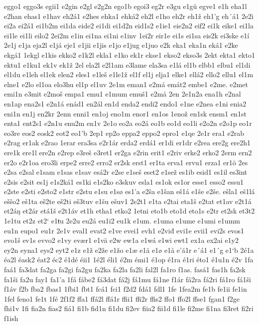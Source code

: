 eggo1
eggo3s
egii1
e2gin
e2gl
e2g2n
ego1b
egoi3
eg2r
e3gu
e1gü
egve1
e1h
eha1l
e2han
ehas1
e1hav
eh2á1
e2hes
ehka1
ehká2
eh2l
e1ho
eh2r
eh1ž
eh1'g
eh´á1
2e2i
ei2a
ei2á1
ei1b2m
ei1da
eide2
ei1di
ei1d2n
eid1s2
e1ie1
eie2n2
eif2
ei1k
eike1
ei1la
ei1le
ei1li
eilo2
2ei2m
e1in
ei1na
ei1ni
e1inv
1ei2r
eir1e
ei1s
ei1sa
eis2k
ei3ske
e1í
2e1j
e1ja
eja2l
e1já
eje1
e1jii
e1jis
e1jo
e1jug
e1juo
e2k
eka1
eka1n
eká1
e2ke
ekgá1
1ekgl
e1kis
ekko2
e1k2l
ekla1
e1ko
ek1r
ekse1
ekso2
ekso3s
2ekt
ekta1
ekto1
ektu1
e1ku1
ek1v
ek1ž
2el
ela2l
e2l1am
e3lame
ela3sa
e1lá
el1b
elbb1
elbu1
el1di
el1du
e1leh
el1ek
elen2
eles1
e1leš
e1le1ž
el1f
el1j
elja1
elke1
ellá2
ello2
ellu1
el1m
elne1
e2lo
el1oa
elo3hu
el1p
el1uv
2e1m
eman1
e2má
emát2
embe1
e2me.
e2met
emi1n
e3mit
e2moš
empa1
emu1
e1mum
emuš1
e2må
2en
2e1n2a
ena1h
e2nal
en1ap
ena2s1
e2n1á
enád1
en2ál
en1d
enda2
endi2
endo1
e1ne
e2nea
e1ni
enia2
eni1n
en1j
en2kr
2enn
enni1
en1oj
eno1m
enor1
en1os
1enož
en1sk
ensm1
en1st
enta1
ent2s1
e2n1u
enu2m
en1v
2e1o
eo2a
eo2á
eo1b
eo1d
eo1li
e2o2n
e2o1p
eo1r
eo3re
eos2
eosk2
eot2
eo1'b
2ep1
ep2o
eppa2
eppo2
epro1
e1qe
2e1r
era1
e2rab
e2rag
er1ak
e2rao
1erar
era3sa
e2r1ár
erda2
erdá1
er1di
er1dr
e2rea
ere2g
ere2h1
ere1k
ere1l
ere2n
e2rep
e3reš
e3ret1
er2ga
e2rin
erit1
e2riv
erke2
erko2
2erm
ern2
er2o
e2r1oa
ero3li
erpe2
erre2
erro2
er2sk
erst1
er1ta
erva1
ervu1
erza1
er1ö
2es
e2sa
e2sal
e1sam
e1sas
e1sav
esá2r
e2se
e1seš
eset2
e1sež
es1ib
esid1
es1il
es3int
e2sis
e2sit
es1j
e1s2ká1
es1ki
e1s2ko
e3skuv
esla1
es1ok
es1or
esse1
esso2
essu1
e2ste
e2sti
e2sto2
e1str
e2stu
e1su
e1sø
es1'a
e2ša
e1šan
eš1á
e1še
e2še.
ešla1
eš1lá
eššo2
eš1ta
eš2te
eš2ti
eš3tuv
e1šu
ešuv1
2e2t1
e1ta
e2tai
eta1š
e2tat
et1av
e2t1á
et2áŋ
et2ár
etá1š
e2t1áv
et1h
etha1
etko2
1etni
eto1b
eto1d
eto1s
e2tr
et2sk
et3t2
1e1tu
et2z
et2`
e1ŧu
2e2u
eu2á
eu1i2
eu1k
e1um.
e1uma
e1ume
e1umi
e1umm
eu1n
eupo1
eu1r
2e1v
eval1
evat2
e1ve
evei1
evh1
e2viđ
evi1e
evii1
evi2s
evos1
evo1š
ev1s
evvo2
e1vy
evær1
e1vä
e2w
ew1a
e1wá
e1wi
ewt1
ex1a
ex2ai
e1y2
ey2n
eyna1
eys2
eyt2
e1z
e1ž
e2že
e1žo
e1æ
e1ä
e1ø
e1å
e'á1r
e´á1
e1´g
e1`b
2é1a
éa2l
éask2
éat2
éc2
é1dé
éii1
1é2l
éli1
é2m
émi1
é1op
é1ra
é1ri
éto1
é1u1n
é2v
1fa
faá1
fa3dat
fa2ga
fa2gi
fa2gu
fa2ka
fa2la
fa2li
fal2l
fa1ro
f1as.
fasá1
fas1h
fa2sk
fa1ši
fa2u
fay1
fa1'a
1fá
fábe2
fá3dat
fá2j
fá1mu
fá1ne
f1ár
fá2ra
fá2ri
fá1ro
fá1ši
f1áv
f2b
fba2
fbas1
1fbi1
fbt1
fcá1
fci1
f2d2
fdá1
fdl1
1fe
1fea2m
fe1b
fe1ii
fe1in
1fel
feno1
fe1t
1fé
2f1f2
ffa1
ffá2l
ffá1r
ffii1
ffi2r
ffis2
ffo1
ffo2l
ffse1
fgan1
f2ge
fhi1v
1fi
fia2n
fias2
fiá1
fi1b
fid1n
fi1du
fi2ev
fiia2
fii1d
fi1le
fi2me
fi1na
fi3ret
fi2ri
f1ish
